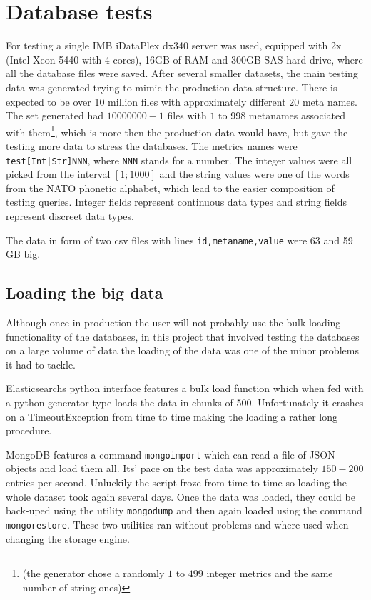 
\section{Database tests}

For testing a single IMB iDataPlex dx340 server was used, equipped with 2x (Intel Xeon 5440 with 4 cores), 16GB
of RAM and 300GB SAS hard drive, where all the database files were saved. After several smaller datasets, 
the main testing data was generated trying to mimic the production data structure. There is expected to
be over 10 million files with approximately different 20 meta names. %
The set generated had $10 000 000 - 1$ files with $1$ to $998$ metanames associated with them\footnote{ 
(the generator chose a randomly $1$ to $499$ integer metrics and the same number of string ones)}, which is more
then the production data would have, but gave the testing more data to stress the databases.
The metrics names were \texttt{test[Int|Str]NNN}, where \texttt{NNN} stands for a number. The
integer values were all picked from the interval $[1;1000]$ and the string values were one of the
words from the NATO phonetic alphabet\cite{NATO}, which lead to the easier composition of testing queries. 
Integer fields represent continuous data types and string fields represent discreet data types.

The data in form of two csv files with lines \texttt{id,metaname,value} were 63 and 59 GB big.

\subsection{Loading the big data}

Although once in production the user will not probably use the bulk loading functionality of the databases, in
this project that involved testing the databases on a large volume of data the loading of the data was one 
of the minor problems it had to tackle.

Elasticsearchs python interface features a bulk load function which when fed with a python generator type
loads the data in chunks of 500. Unfortunately it crashes on a TimeoutException from time to 
time making the loading a rather long procedure. 

MongoDB features a command \texttt{mongoimport} which can read a file of JSON objects and load
them all. Its' pace on the test data was approximately $150-200$ entries per second. Unluckily 
the script froze from time to time so loading the whole dataset took again several days. Once the data was
loaded, they could be back-uped using the utility \texttt{mongodump} and then again loaded using the 
command \texttt{mongorestore}. These two utilities ran without problems and where used when changing the 
storage engine.

